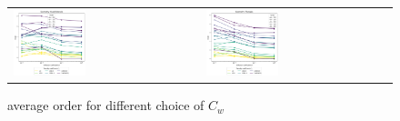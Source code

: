 \begin{example}
\begin{figure}[h!]
	\centering
	\begin{tabular}{p{} p{}}
		\vspace{0pt} 
		\includegraphics[width=0.4\textwidth]{../figs/parametric/advdiff_2D/ord_quarteroni1_2_4}
		&
		\vspace{0pt} 
		\includegraphics[width=0.4\textwidth]{../figs/parametric/advdiff_2D/ord_quarteroni1_2_3}
	\end{tabular}
	\caption{ average order for different choice of $C_w$}
	\label{fig:orders_quarteroni1}
\end{figure}



\end{example}
